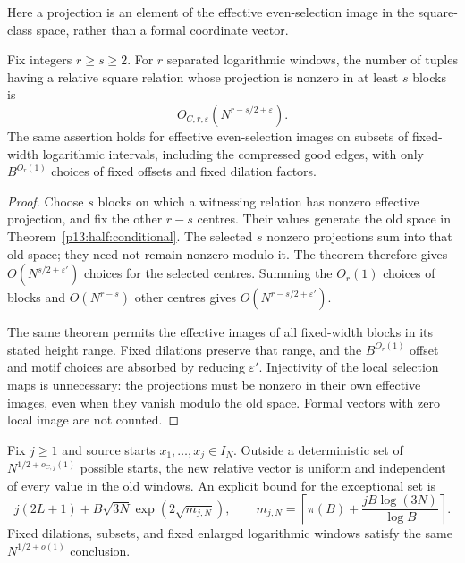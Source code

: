 Here a projection is an element of the effective even-selection image
in the square-class space, rather than a formal coordinate vector.

\begin{proposition}
\label{p1:arith:fixed-support}
Fix integers $r\geq s\geq2$.  For $r$ separated logarithmic windows,
the number of tuples having a relative square relation whose projection
is nonzero in at least $s$ blocks is
\[
 O_{C,r,\varepsilon}\left(N^{r-s/2+\varepsilon}\right).
\]
The same assertion holds for effective even-selection images on subsets
of fixed-width logarithmic intervals, including the compressed good edges,
with only $B^{O_r(1)}$ choices of fixed offsets and fixed dilation factors.
\end{proposition}

\begin{proof}
Choose $s$ blocks on which a witnessing relation has nonzero effective
projection, and fix the other $r-s$ centres. Their values generate the
old space in Theorem~\ref{p13:half:conditional}. The selected $s$
nonzero projections sum into that old space; they need not remain
nonzero modulo it. The theorem therefore gives
$O(N^{s/2+\varepsilon'})$ choices for the selected centres.
Summing the $O_r(1)$ choices of blocks and $O(N^{r-s})$ other centres
gives $O(N^{r-s/2+\varepsilon'})$.

The same theorem permits the effective images of all fixed-width blocks
in its stated height range. Fixed dilations preserve that range, and
the $B^{O_r(1)}$ offset and motif choices are absorbed by reducing
$\varepsilon'$. Injectivity of the local selection maps is unnecessary:
the projections must be nonzero in their own effective images, even when
they vanish modulo the old space. Formal vectors with zero local image
are not counted.
\end{proof}

\begin{proposition}
\label{p1:arith:fixed-branching}
Fix $j\geq1$ and source starts $x_1,\ldots,x_j\in I_N$.
Outside a deterministic set of $N^{1/2+o_{C,j}(1)}$ possible starts,
the new relative vector is uniform and independent of every value in
the old windows.  An explicit bound for the exceptional set is
\[
 j(2L+1)+B\sqrt{3N}\exp(2\sqrt{m_{j,N}}),\qquad
 m_{j,N}=\left\lceil\pi(B)+\frac{jB\log(3N)}{\log B}\right\rceil.
\]
Fixed dilations, subsets, and fixed enlarged logarithmic windows satisfy
the same $N^{1/2+o(1)}$ conclusion.
\end{proposition}

